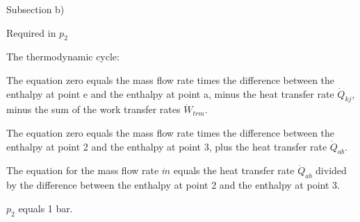 Subsection b)

Required in \( p_2 \)

The thermodynamic cycle:

The equation zero equals the mass flow rate times the difference between the enthalpy at point e and the enthalpy at point a, minus the heat transfer rate \( \dot{Q}_{kj} \), minus the sum of the work transfer rates \( \dot{W}_{trm} \).

The equation zero equals the mass flow rate times the difference between the enthalpy at point 2 and the enthalpy at point 3, plus the heat transfer rate \( \dot{Q}_{ab} \).

The equation for the mass flow rate \( \dot{m} \) equals the heat transfer rate \( \dot{Q}_{ab} \) divided by the difference between the enthalpy at point 2 and the enthalpy at point 3.

\( p_2 \) equals 1 bar.